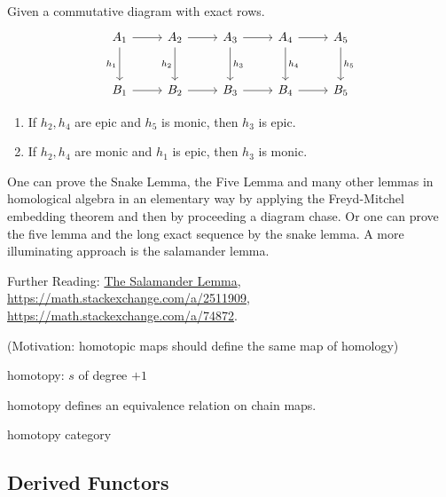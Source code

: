 \begin{lemma}
  Given a commutative diagram with exact rows.
  \begin{equation*}
    \begin{tikzcd}[row sep=large]
      A_1 & A_2 & A_3 & A_4 & A_5\\
      B_1 & B_2 & B_3 & B_4 & B_5
      \arrow[from=1-1,]{1-2}[]{}
      \arrow[from=1-2,]{1-3}[]{}
      \arrow[from=1-3,]{1-4}[]{}
      \arrow[from=1-4,]{1-5}[]{}
      \arrow[from=2-1,]{2-2}[]{}
      \arrow[from=2-2,]{2-3}[]{}
      \arrow[from=2-3,]{2-4}[]{}
      \arrow[from=2-4,]{2-5}[]{}
      \arrow[from=1-1,]{2-1}[swap]{h_1}
      \arrow[from=1-2,]{2-2}[swap]{h_2}
      \arrow[from=1-3,]{2-3}[]{h_3}
      \arrow[from=1-4,]{2-4}[]{h_4}
      \arrow[from=1-5,]{2-5}[]{h_5}
    \end{tikzcd}
  \end{equation*}
  \begin{enumerate}
    \item If $h_2, h_4$ are epic and $h_5$ is monic, then $h_3$ is epic.
    \item If $h_2, h_4$ are monic and $h_1$ is epic, then $h_3$ is monic.
  \end{enumerate}
\end{lemma}

One can prove the Snake Lemma, the Five Lemma and many other lemmas in homological algebra in an elementary way by applying the Freyd-Mitchel embedding theorem and then by proceeding a diagram chase. Or one can prove the five lemma and the long exact sequence by the snake lemma. A more illuminating approach is the salamander lemma.

Further Reading: \href{https://ncatlab.org/nlab/show/salamander+lemma}{The Salamander Lemma}, \url{https://math.stackexchange.com/a/2511909}, \url{https://math.stackexchange.com/a/74872}.

(Motivation: homotopic maps should define the same map of homology)

homotopy: $s$ of degree $+1$

homotopy defines an equivalence relation on chain maps.

homotopy category

\subsection{Derived Functors}


